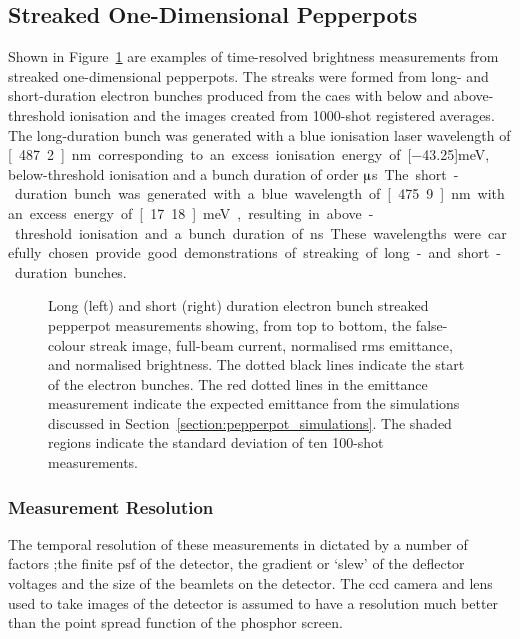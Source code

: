 \subsection{Streaked One-Dimensional Pepperpots}\label{section:streaked_pepperpot_results}
Shown in Figure~\ref{figure:streaks} are examples of time-resolved brightness measurements from streaked one-dimensional pepperpots.
The streaks were formed from long- and short-duration electron bunches produced from the \gls{caes} with below and above-threshold ionisation and the images created from 1000-shot registered averages.
The long-duration bunch was generated with a blue ionisation laser wavelength of \unit[487.2]{nm} corresponding to an excess ionisation energy of \unit[$-$43.25]{meV}, below-threshold ionisation and a bunch duration of order \unit[10]{$\muup$s}.
The short-duration bunch was generated with a blue wavelength of \unit[475.9]{nm} with an excess energy of \unit[17.18]{meV}, resulting in above-threshold ionisation and a bunch duration of \unit[5]{ns}.
These wavelengths were carefully chosen provide good demonstrations of streaking of long- and short-duration bunches.

\begin{figure}
    \center
    
    \caption{Long (left) and short (right) duration electron bunch streaked pepperpot measurements showing, from top to bottom, the false-colour streak image, full-beam current, normalised \gls{rms} emittance, and normalised brightness. The dotted black lines indicate the start of the electron bunches. The red dotted lines in the emittance measurement indicate the expected emittance from the simulations discussed in Section~\ref{section:pepperpot_simulations}. The shaded regions indicate the standard deviation of ten 100-shot measurements.}
    \label{figure:streaks}
\end{figure}

\subsubsection{Measurement Resolution}
The temporal resolution of these measurements in dictated by a number of factors ;the finite \gls{psf} of the detector, the gradient or `slew' of the deflector voltages and the size of the beamlets on the detector.
The \gls{ccd} camera and lens used to take images of the detector is assumed to have a resolution much better than the point spread function of the phosphor screen.

